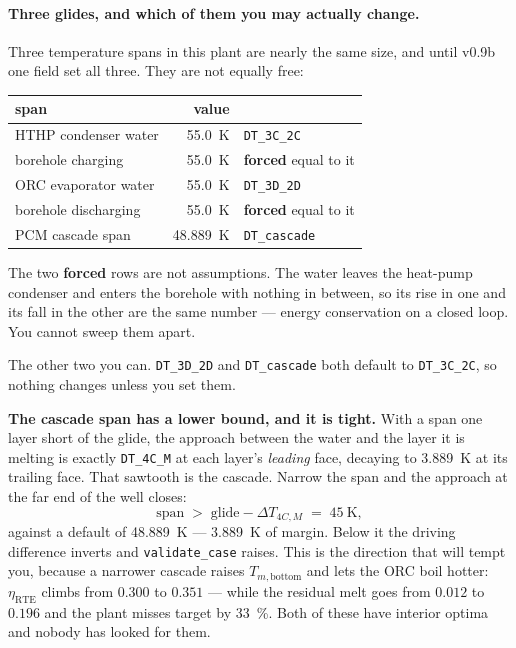 \documentclass[11pt,a4paper]{article}
\newcommand{\code}[1]{\texttt{\small #1}}
\begin{document}
\paragraph{Three glides, and which of them you may actually change.}
Three temperature spans in this plant are nearly the same size, and until v0.9b
one field set all three. They are not equally free:

\begin{center}
\begin{tabular}{@{}l r l@{}}
\toprule
span & value & \\
\midrule
HTHP condenser water & \SI{55.0}{\kelvin} & \code{DT\_3C\_2C} \\
borehole charging    & \SI{55.0}{\kelvin} & \textbf{forced} equal to it \\
ORC evaporator water & \SI{55.0}{\kelvin} & \code{DT\_3D\_2D} \\
borehole discharging & \SI{55.0}{\kelvin} & \textbf{forced} equal to it \\
PCM cascade span     & \SI{48.889}{\kelvin} & \code{DT\_cascade} \\
\bottomrule
\end{tabular}
\end{center}

\noindent
The two \textbf{forced} rows are not assumptions. The water leaves the heat-pump
condenser and enters the borehole with nothing in between, so its rise in one
and its fall in the other are the same number --- energy conservation on a
closed loop. You cannot sweep them apart.

The other two you can. \code{DT\_3D\_2D} and \code{DT\_cascade} both default to
\code{DT\_3C\_2C}, so nothing changes unless you set them.

\medskip
\noindent\textbf{The cascade span has a lower bound, and it is tight.} With a
span one layer short of the glide, the approach between the water and the layer
it is melting is exactly \code{DT\_4C\_M} at each layer's \emph{leading} face,
decaying to \SI{3.889}{\kelvin} at its trailing face. That sawtooth is the
cascade. Narrow the span and the approach at the far end of the well closes:
$$\text{span} \;>\; \text{glide} - \Delta T_{4C,M} \;=\; \SI{45}{\kelvin},$$
against a default of \SI{48.889}{\kelvin} --- \SI{3.889}{\kelvin} of margin.
Below it the driving difference inverts and \code{validate\_case} raises. This
is the direction that will tempt you, because a narrower cascade raises
$T_{m,\mathrm{bottom}}$ and lets the ORC boil hotter:
$\eta_{\mathrm{RTE}}$ climbs from $0.300$ to $0.351$ --- while the residual melt
goes from $0.012$ to $0.196$ and the plant misses target by \SI{33}{\percent}.
Both of these have interior optima and nobody has looked for them.
\end{document}
